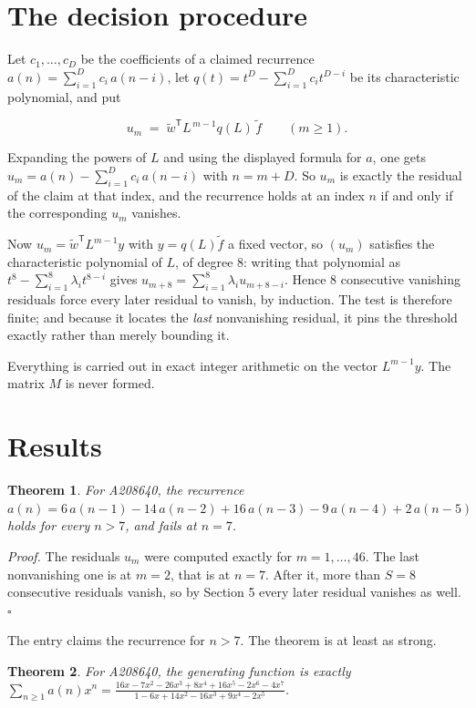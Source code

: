 \documentclass[11pt]{article}
\newtheorem{theorem}{Theorem}
\theoremstyle{definition}
\begin{document}
\section{The decision procedure}

Let $c_1,\dots,c_D$ be the coefficients of a claimed recurrence $a(n) = \sum_{i=1}^{D} c_i\,a(n-i)$, let $q(t) = t^{D} - \sum_{i=1}^{D} c_i t^{D-i}$ be its characteristic polynomial, and put

\[u_m \;=\; \tilde w^{\mathsf T} L^{\,m-1} q(L)\,\tilde f \qquad (m \ge 1).\]

Expanding the powers of $L$ and using the displayed formula for $a$, one gets $u_m = a(n) - \sum_{i=1}^{D} c_i\,a(n-i)$ with $n = m + D$. So $u_m$ is exactly the residual of the claim at that index, and the recurrence holds at an index $n$ if and only if the corresponding $u_m$ vanishes.

Now $u_m = \tilde w^{\mathsf T} L^{m-1} y$ with $y = q(L)\tilde f$ a fixed vector, so $(u_m)$ satisfies the characteristic polynomial of $L$, of degree $8$: writing that polynomial as $t^{8} - \sum_{i=1}^{8} \lambda_i t^{8-i}$ gives $u_{m+8} = \sum_{i=1}^{8} \lambda_i u_{m+8-i}$. Hence $8$ consecutive vanishing residuals force every later residual to vanish, by induction. The test is therefore finite; and because it locates the {\itshape last} nonvanishing residual, it pins the threshold exactly rather than merely bounding it.

Everything is carried out in exact integer arithmetic on the vector $L^{m-1}y$. The matrix $M$ is never formed.

\section{Results}

\begin{theorem} For A208640, the recurrence $a(n) = 6\,a(n-1) - 14\,a(n-2) + 16\,a(n-3) - 9\,a(n-4) + 2\,a(n-5)$ holds for every $n > 7$, and fails at $n = 7$.\end{theorem}

{\itshape Proof.} The residuals $u_m$ were computed exactly for $m = 1,\dots,46$. The last nonvanishing one is at $m = 2$, that is at $n = 7$. After it, more than $S = 8$ consecutive residuals vanish, so by Section 5 every later residual vanishes as well. $\square$

The entry claims the recurrence for $n > 7$. The theorem is at least as strong.

\begin{theorem} For A208640, the generating function is exactly $\sum_{n\ge 1} a(n)x^n = \frac{16x - 7x^{2} - 26x^{3} + 8x^{4} + 16x^{5} - 2x^{6} - 4x^{7}}{1 - 6x + 14x^{2} - 16x^{3} + 9x^{4} - 2x^{5}}$.\end{theorem}
\end{document}
